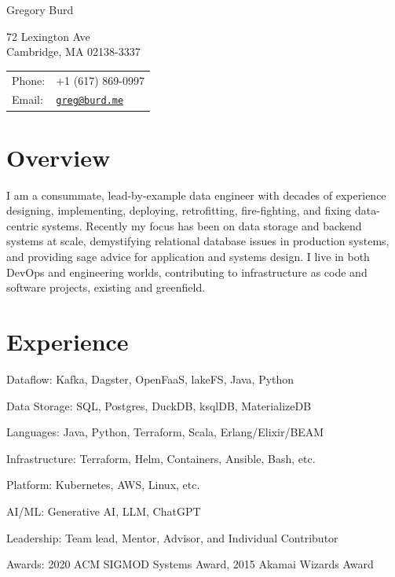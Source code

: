 \documentclass[letterpaper]{article}
\def\name{Gregory Burd}
\renewenvironment{itemize}{
  \begin{list}{}{
    \setlength{\leftmargin}{1.5em}
  }
}{
  \end{list}
}
\begin{document}
{\huge \name}


\vspace{0.25in}

\begin{minipage}{0.45\linewidth}
  72 Lexington Ave \\
  Cambridge, MA 02138-3337
\end{minipage}
\begin{minipage}{0.45\linewidth}
  \begin{tabular}{ll}
    Phone: & +1 (617) 869-0997 \\
    Email: & \href{mailto:greg@burd.me}{\tt greg@burd.me} \\
  \end{tabular}
\end{minipage}

\vspace{0.25in}

\section*{Overview}

I am a consummate, lead-by-example data engineer with decades of experience designing, implementing, deploying, retrofitting, fire-fighting, and fixing data-centric systems. Recently my focus has been on data storage and backend systems at scale, demystifying relational database issues in production systems, and providing sage advice for application and systems design.  I live in both DevOps and engineering worlds, contributing to infrastructure as code and software projects, existing and greenfield.

\section*{Experience}

\begin{itemize}
\item Dataflow: Kafka, Dagster, OpenFaaS, lakeFS, Java, Python
\item Data Storage: SQL, Postgres, DuckDB, ksqlDB, MaterializeDB
\item Languages: Java, Python, Terraform, Scala, Erlang/Elixir/BEAM
\item Infrastructure: Terraform, Helm, Containers, Ansible, Bash, etc.
\item Platform: Kubernetes, AWS, Linux, etc.
\item AI/ML: Generative AI, LLM, ChatGPT
\item Leadership: Team lead, Mentor, Advisor, and Individual Contributor
\item Awards: 2020 ACM SIGMOD Systems Award, 2015 Akamai Wizards Award
\end{itemize}
\end{document}
